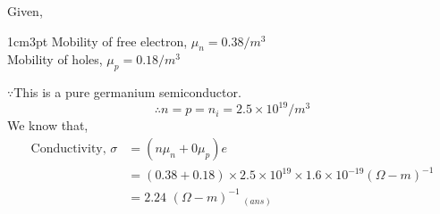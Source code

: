 \documentclass[a4aper,12pt]{report}
\begin{document}
\begin{tcolorbox}[breakable, title={\textbf{Example 1.1}: The mobilities of free electron and holes in a pure germanium are 0.38 and 0.18 $m^2/V.s$. Find the value of intrinsic conductivity. Assume $n_i = 2.5\times 10^{19}/m^3$ at room temperature.}]
    Given,
\begin{adjustwidth}{1cm}{3pt}
    Mobility of free electron, $\mu_n = 0.38/m^3$ \\ 
    Mobility of holes, $\mu_p = 0.18/m^3$
\end{adjustwidth}
$\because $This is a pure germanium semiconductor.
\vspace*{-5pt}
$$\therefore n = p = n_i = 2.5\times 10^{19}/m^3$$
We know that,
\vspace*{-5pt}
\begin{align*}
    \text{Conductivity},\, \sigma &= (n\mu_n+0\mu_p)e \\ 
    &= (0.38+0.18)\times 2.5\times 10^{19}\times 1.6\times10^{-19} (\Omega-m)^{-1} \\ 
    &= 2.24\,\,(\Omega-m)^{-1} \, _{(ans)}
\end{align*}
\end{tcolorbox}
\end{document}
